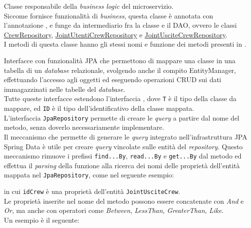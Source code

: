 Classe responsabile della \textit{business logic} del \gls{microservizio}.  \\
Siccome fornisce funzionalità di \textit{business}, questa classe è annotata con l'annotazione , e funge da intermediario fra la classe  e  il \gls{DAO}, ovvero le classi \hyperref[CrewRepository]{CrewRepository}, \hyperref[JointUtentiCrewRepository]{JointUtentiCrewRepository} e \hyperref[JointUsciteCrewRepository]{JointUsciteCrewRepository}. \\
I metodi di questa classe hanno gli stessi nomi e funzione dei metodi presenti in .

\label{Repository}
Interfacce con funzionalità \gls{JPA} che permettono di mappare una classe in una tabella di un \textit{database} relazionale, svolgendo anche il compito \gls{EntityManager}, effettuando l'accesso agli oggetti ed eseguendo operazioni \gls{CRUD} sui dati immagazzinati nelle tabelle del \textit{database}.\\
Tutte queste interfacce estendono l'interfaccia , dove \texttt{T} è il tipo della classe da mappare, ed \texttt{ID} è il tipo dell'identificativo della classe mappata.\\
L'interfaccia \texttt{JpaRepository} permette di creare le \textit{query} a partire dal nome del metodo, senza doverlo necessariamente implementare.\\
Il meccanismo che permette di generare le \textit{query} integrato nell'infrastruttura JPA Spring Data è utile per creare \textit{query} vincolate sulle entità del \textit{repository}. Questo meccanismo rimuove i prefissi \texttt{find...By}, \texttt{read...By} e \texttt{get...By} dal metodo ed effettua il \textit{parsing} della funzione alla ricerca dei nomi delle proprietà dell'entità mappata nel \texttt{JpaRepository}, come nel seguente esempio: 
\begin{center}
\end{center}
in cui \texttt{idCrew} è una proprietà dell'entità \texttt{JointUsciteCrew}.\\ 
 Le proprietà inserite nel nome del metodo possono essere concatenate con \textit{And} e \textit{Or}, ma anche con operatori come \textit{Between}, \textit{LessThan}, \textit{GreaterThan}, \textit{Like}. \\
 Un esempio è il seguente: 
